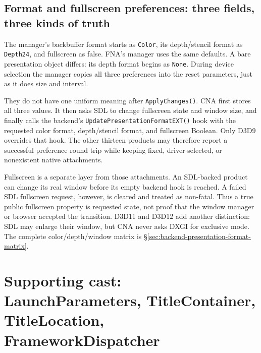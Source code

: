 \subsection{Format and fullscreen preferences: three fields, three kinds of truth}

The manager's backbuffer format starts as \texttt{Color}, its depth/stencil format as
\texttt{Depth24}, and fullscreen as false. FNA's manager uses the same defaults. A bare
presentation object differs: its depth format begins as \texttt{None}. During device
selection the manager copies all three preferences into the reset parameters, just as it
does size and interval.

They do not have one uniform meaning after \texttt{ApplyChanges()}. CNA first stores all
three values. It then asks SDL to change fullscreen state and window size, and finally calls
the backend's \texttt{UpdatePresentationFormatEXT()} hook with the requested color format,
depth/stencil format, and fullscreen Boolean. Only D3D9 overrides that hook. The other
thirteen products may therefore report a successful preference round trip while keeping
fixed, driver-selected, or nonexistent native attachments.

Fullscreen is a separate layer from those attachments. An SDL-backed product can change its
real window before its empty backend hook is reached. A failed SDL fullscreen request,
however, is cleared and treated as non-fatal. Thus a true public fullscreen property is
requested state, not proof that the window manager or browser accepted the transition.
D3D11 and D3D12 add another distinction: SDL may enlarge their window, but CNA never asks
DXGI for exclusive mode. The complete color/depth/window matrix is
\S\ref{sec:backend-presentation-format-matrix}.

\section{Supporting cast: LaunchParameters, TitleContainer, TitleLocation, FrameworkDispatcher}

